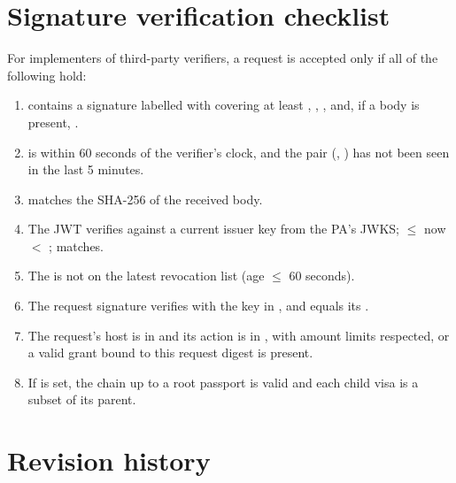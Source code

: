 \section{Signature verification checklist}

For implementers of third-party verifiers, a request is accepted only if all of the following hold:

\begin{enumerate}
  \item {} contains a signature labelled with  covering at least , , ,  and, if a body is present, .
  \item {} is within 60 seconds of the verifier's clock, and the pair (, ) has not been seen in the last 5 minutes.
  \item {} matches the SHA-256 of the received body.
  \item The  JWT verifies against a current issuer key from the PA's JWKS;  $\le$ now $<$ ;  matches.
  \item The  is not on the latest revocation list (age $\le$ 60 seconds).
  \item The request signature verifies with the key in , and  equals its .
  \item The request's host is in  and its action is in , with amount limits respected, or a valid  grant bound to this request digest is present.
  \item If  is set, the chain up to a root passport is valid and each child visa is a subset of its parent.
\end{enumerate}

\section{Revision history}

